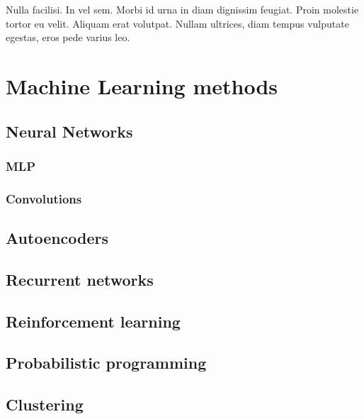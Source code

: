 \begin{savequote}[75mm]
Nulla facilisi. In vel sem. Morbi id urna in diam dignissim feugiat. Proin molestie tortor eu velit. Aliquam erat volutpat. Nullam ultrices, diam tempus vulputate egestas, eros pede varius leo.
\end{savequote}

\chapter{Machine Learning methods}

\section{Neural Networks}
\subsection{MLP}
\subsection{Convolutions}
\section{Autoencoders}
\section{Recurrent networks}
\section{Reinforcement learning}
\section{Probabilistic programming}
\section{Clustering}
\label{sec:clustering}
